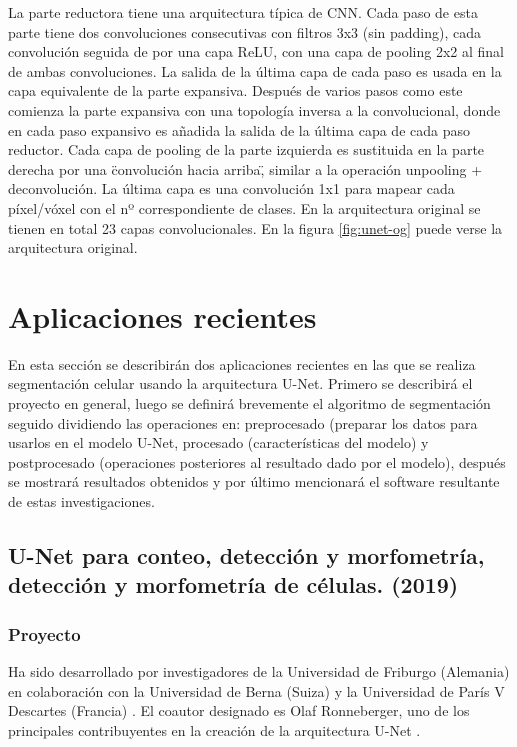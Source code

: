 La parte reductora tiene una arquitectura típica de CNN. Cada paso de esta parte tiene dos convoluciones consecutivas con filtros 3x3 (sin padding), cada convolución seguida de por una capa ReLU, con una capa de pooling 2x2 al final de ambas convoluciones. La salida de la última capa de cada paso es usada en la capa equivalente de la parte expansiva. Después de varios pasos como este comienza la parte expansiva con una topología inversa a la convolucional, donde en cada paso expansivo es añadida la salida de la última capa de cada paso reductor. Cada capa de pooling de la parte izquierda es sustituida en la parte derecha por una \"convolución hacia arriba\", similar a la operación unpooling + deconvolución. La última capa es una convolución 1x1 para mapear cada píxel/vóxel con el nº correspondiente de clases. En la arquitectura original se tienen en total 23 capas convolucionales. En la figura \ref{fig:unet-og} puede verse la arquitectura original.


\section{Aplicaciones recientes}\label{sec:apps}

En esta sección se describirán dos aplicaciones recientes en las que se realiza segmentación celular usando la arquitectura U-Net. Primero se describirá el proyecto en general, luego se definirá brevemente el algoritmo de segmentación seguido dividiendo las operaciones en: preprocesado (preparar los datos para usarlos en el modelo U-Net, procesado (características del modelo) y postprocesado (operaciones posteriores al resultado dado por el modelo), después se mostrará resultados obtenidos y por último mencionará el software resultante de estas investigaciones.

\subsection{U-Net para conteo, detección y morfometría, detección y morfometría de células. (2019)}
\subsubsection{Proyecto}

Ha sido desarrollado por investigadores de la Universidad de Friburgo (Alemania) en colaboración con la Universidad de Berna (Suiza) y la Universidad de París V Descartes (Francia) \cite{Falk2019}. El coautor designado es Olaf Ronneberger, uno de los principales contribuyentes en la creación de la arquitectura U-Net \cite{Ronneberger2015}.

